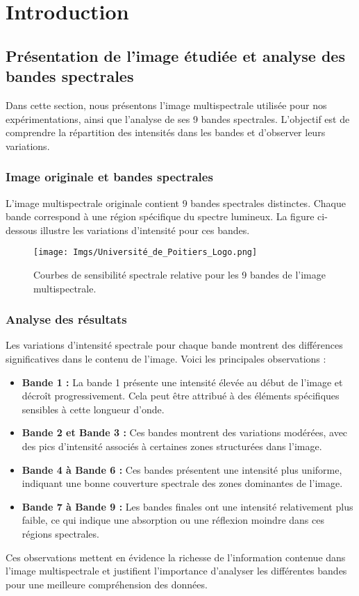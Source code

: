 \chapter{Introduction}
\section{Présentation de l'image étudiée et analyse des bandes spectrales}

Dans cette section, nous présentons l'image multispectrale utilisée pour nos expérimentations, ainsi que l'analyse de ses 9 bandes spectrales. L'objectif est de comprendre la répartition des intensités dans les bandes et d'observer leurs variations. \cite{islam2012artificial}

\subsection{Image originale et bandes spectrales}

L'image multispectrale originale contient 9 bandes spectrales distinctes. Chaque bande correspond à une région spécifique du spectre lumineux. La figure ci-dessous illustre les variations d'intensité pour ces bandes.

\begin{figure}[H]
    \centering
    \texttt{[image: Imgs/Université\_de\_Poitiers\_Logo.png]}
    \caption{Courbes de sensibilité spectrale relative pour les 9 bandes de l'image multispectrale.}
    \label{fig:multispectral_bands}
\end{figure}

\subsection{Analyse des résultats}

Les variations d'intensité spectrale pour chaque bande montrent des différences significatives dans le contenu de l'image. Voici les principales observations :
\begin{itemize}
    \item \textbf{Bande 1 :} La bande 1 présente une intensité élevée au début de l'image et décroît progressivement. Cela peut être attribué à des éléments spécifiques sensibles à cette longueur d'onde.
    \item \textbf{Bande 2 et Bande 3 :} Ces bandes montrent des variations modérées, avec des pics d'intensité associés à certaines zones structurées dans l'image.
    \item \textbf{Bande 4 à Bande 6 :} Ces bandes présentent une intensité plus uniforme, indiquant une bonne couverture spectrale des zones dominantes de l'image.
    \item \textbf{Bande 7 à Bande 9 :} Les bandes finales ont une intensité relativement plus faible, ce qui indique une absorption ou une réflexion moindre dans ces régions spectrales.
\end{itemize}

Ces observations mettent en évidence la richesse de l'information contenue dans l'image multispectrale et justifient l'importance d'analyser les différentes bandes pour une meilleure compréhension des données.
